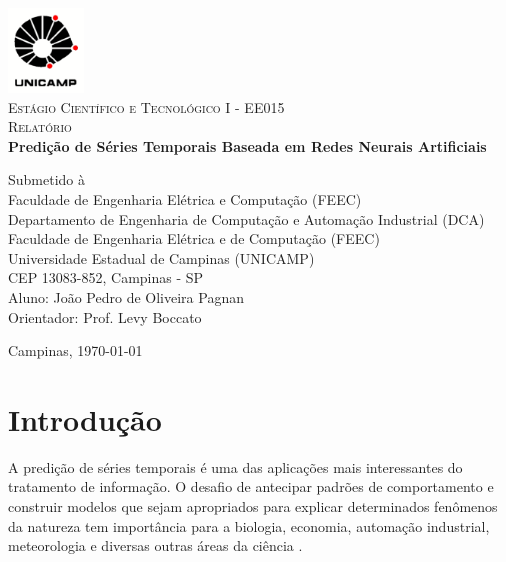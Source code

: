 \documentclass[a4paper, 12pt]{article}
\begin{document}
\begin{titlepage}
\newcommand{\HRule}{\rule{\linewidth}{1.5mm}}
	
\center

\includegraphics[width=0.15\textwidth]{logo-unicamp.pdf}\\[1.0cm]

\textsc{\Large Estágio Científico e Tecnológico I - EE015}\\[0.5cm]

\textsc{\large Relatório}\\[1.5cm]

{\Large \bfseries Predição de Séries Temporais Baseada em Redes Neurais Artificiais}\\[2.5cm]

\begin{flushleft}
Submetido à \\ Faculdade de Engenharia Elétrica e Computação (FEEC)\\[1.5cm]

Departamento de Engenharia de Computação e Automação Industrial (DCA)\\
Faculdade de Engenharia Elétrica e de Computação (FEEC)\\
Universidade Estadual de Campinas (UNICAMP)\\
CEP 13083-852, Campinas - SP\\[1.0cm]

Aluno: João Pedro de Oliveira Pagnan\\
Orientador: Prof. Levy Boccato \\[4.5cm]
\end{flushleft}	
	
Campinas, \today

\end{titlepage}

\newpage

\section{Introdução}
A predição de séries temporais é uma das aplicações mais interessantes do tratamento de informação. O desafio de antecipar padrões de comportamento e construir modelos que sejam apropriados para explicar determinados fenômenos da natureza tem importância para a biologia, economia, automação industrial, meteorologia e diversas outras áreas da ciência \cite{box2015time}.
\end{document}

